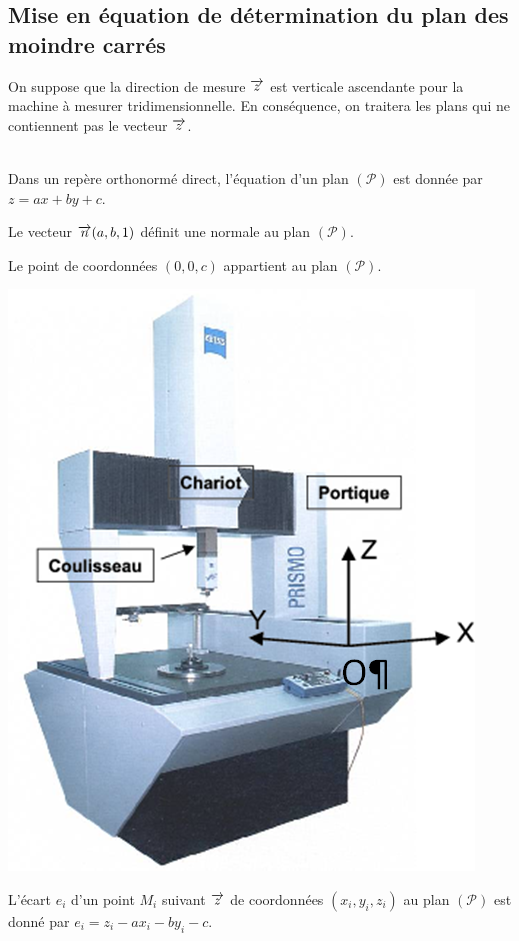 \documentclass[10pt,fleqn]{article} %
\begin{document}
\subsection{Mise en équation de détermination du plan des moindre carrés}
\ifprof
\else
\noindent\begin{minipage}[c]{.75\linewidth}
On suppose que la direction de mesure $\overrightarrow{z}$ est verticale ascendante pour la machine à mesurer tridimensionnelle. En conséquence, on traitera les plans qui ne contiennent pas le vecteur $\overrightarrow{z}$.

\begin{rappel}
$\quad$\\

Dans un repère orthonormé direct, l'équation d'un plan $\left( \mathcal{P}\right)$ est donnée par $z=ax+by+c$.

Le vecteur $\overrightarrow{n}(a,b,1)$ définit une normale au plan $\left( \mathcal{P}\right)$.

Le point de coordonnées $(0,0,c)$ appartient au plan $\left( \mathcal{P}\right)$.

\end{rappel}
\end{minipage} \hfill
\begin{minipage}[c]{.2\linewidth}
\begin{center}
\includegraphics[width=.95\textwidth]{images/MMT}
\end{center}
\end{minipage}
L'écart $e_i$ d'un point  $M_i$ suivant $\overrightarrow{z}$ de coordonnées $\left(x_i,y_i,z_i\right)$ au plan $\left( \mathcal{P}\right)$ est donné par 
$e_i = z_i -ax_i -by_i -c$.
\end{document}
